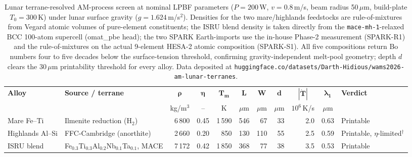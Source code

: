 \documentclass[11pt,a4paper]{article}
\begin{document}
\begin{landscape}
\begin{table}[p]
\centering
\caption{Lunar terrane-resolved AM-process screen at nominal LPBF parameters ($P = 200$\,W, $v = 0.8$\,m/s, beam radius 50\,$\mu$m, build-plate $T_0 = 300$\,K) under lunar surface gravity ($g = 1.624$\,m/s$^2$). Densities for the two mare/highlands feedstocks are rule-of-mixtures from Vegard atomic volumes of pure-element constituents; the ISRU blend density is taken directly from the \texttt{mace-mh-1}-relaxed BCC 100-atom supercell (omat\_pbe head); the two SPARK Earth-imports use the in-house Phase-2 measurement (SPARK-R1) and the rule-of-mixtures on the actual 9-element HESA-2 atomic composition (SPARK-S1). All five compositions return Bo numbers four to five decades below the surface-tension threshold, confirming gravity-independent melt-pool geometry; depth $d$ clears the 30\,$\mu$m printability threshold for every alloy. Data deposited at \texttt{huggingface.co/datasets/Darth-Hidious/wams2026-am-lunar-terranes}.}
\label{tab:lunar_terrane_am}
\footnotesize
\begin{tabular}{llrrrrrrrrl}
\toprule
\textbf{Alloy} &
  \textbf{Source / terrane} &
  \multicolumn{1}{c}{$\boldsymbol{\rho}$} &
  \multicolumn{1}{c}{$\boldsymbol{\eta}$} &
  \multicolumn{1}{c}{$\boldsymbol{T_m}$} &
  \multicolumn{1}{c}{$\boldsymbol{L}$} &
  \multicolumn{1}{c}{$\boldsymbol{W}$} &
  \multicolumn{1}{c}{$\boldsymbol{d}$} &
  \multicolumn{1}{c}{$\boldsymbol{|\dot T|}$} &
  \multicolumn{1}{c}{$\boldsymbol{\lambda_1}$} &
  \textbf{Verdict} \\
 & &
  \multicolumn{1}{c}{\scriptsize kg/m$^3$} &
  \multicolumn{1}{c}{\scriptsize --} &
  \multicolumn{1}{c}{\scriptsize K} &
  \multicolumn{1}{c}{\scriptsize $\mu$m} &
  \multicolumn{1}{c}{\scriptsize $\mu$m} &
  \multicolumn{1}{c}{\scriptsize $\mu$m} &
  \multicolumn{1}{c}{\scriptsize $10^6$\,K/s} &
  \multicolumn{1}{c}{\scriptsize $\mu$m} &
  \\
\midrule
Mare Fe--Ti     & Ilmenite reduction (H$_2$)       & 6\,800   & 0.45 & 1\,590 & 546 & 67  & 33 & 2.0 & 0.63 & Printable                  \\
Highlands Al--Si & FFC-Cambridge (anorthite)        & 2\,660   & 0.20 &   850  & 130 & 110 & 55 & 2.5 & 0.59 & Printable, $\eta$-limited$^\dagger$ \\
ISRU blend      & Fe$_{0.3}$Ti$_{0.3}$Al$_{0.2}$Nb$_{0.1}$Ta$_{0.1}$, MACE & 7\,172   & 0.42 & 1\,850 & 368 & 77  & 38 & 3.5 & 0.53 & Printable                  \\

\end{tabular}
\end{table}
\end{landscape}
\end{document}
